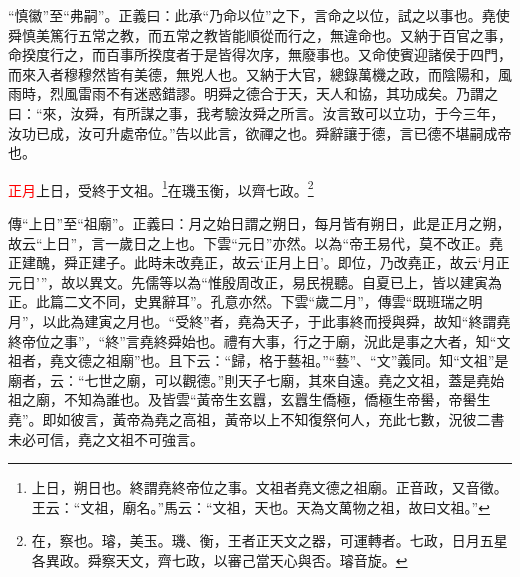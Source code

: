 {\noindent\shu{}\fzkt “慎徽”至“弗嗣”。正義曰：此承“乃命以位”之下，言命之以位，試之以事也。堯使舜慎美篤行五常之教，而五常之教皆能順從而行之，無違命也。又納于百官之事，命揆度行之，而百事所揆度者于是皆得次序，無廢事也。又命使賓迎諸侯于四門，而來入者穆穆然皆有美德，無兇人也。又納于大官，總錄萬機之政，而陰陽和，風雨時，烈風雷雨不有迷惑錯謬。明舜之德合于天，天人和協，其功成矣。乃謂之曰：“來，汝舜，有所謀之事，我考驗汝舜之所言。汝言致可以立功，于今三年，汝功已成，汝可升處帝位。”告以此言，欲禪之也。舜辭讓于德，言已德不堪嗣成帝也。 \par}

\textcolor{red}{正月}上日，受終于文祖。\footnote{上日，朔日也。終謂堯終帝位之事。文祖者堯文德之祖廟。正音政，又音徵。王云：“文祖，廟名。”馬云：“文祖，天也。天為文萬物之祖，故曰文祖。”}在璣玉衡，以齊七政。\footnote{在，察也。璿，美玉。璣、衡，王者正天文之器，可運轉者。七政，日月五星各異政。舜察天文，齊七政，以審己當天心與否。璿音旋。}

{\noindent\zhuan{}\fzbyks 傳“上日”至“祖廟”。正義曰：月之始日謂之朔日，每月皆有朔日，此是正月之朔，故云“上日”，言一歲日之上也。下雲“元日”亦然。以為“帝王易代，莫不改正。堯正建醜，舜正建子。此時未改堯正，故云‘正月上日’。即位，乃改堯正，故云‘月正元日’”，故以異文。先儒等以為“惟殷周改正，易民視聽。自夏已上，皆以建寅為正。此篇二文不同，史異辭耳”。孔意亦然。下雲“歲二月”，傳雲“既班瑞之明月”，以此為建寅之月也。“受終”者，堯為天子，于此事終而授與舜，故知“終謂堯終帝位之事”，“終”言堯終舜始也。禮有大事，行之于廟，況此是事之大者，知“文祖者，堯文德之祖廟”也。且下云：“歸，格于藝祖。”“藝”、“文”義同。知“文祖”是廟者，云：“七世之廟，可以觀德。”則天子七廟，其來自遠。堯之文祖，蓋是堯始祖之廟，不知為誰也。及皆雲“黃帝生玄囂，玄囂生僑極，僑極生帝嚳，帝嚳生堯”。即如彼言，黃帝為堯之高祖，黃帝以上不知復祭何人，充此七數，況彼二書未必可信，堯之文祖不可強言。 \par}

